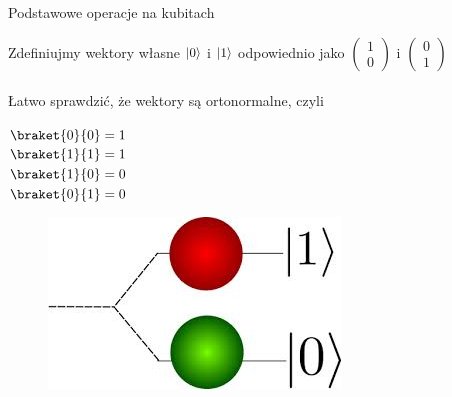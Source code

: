 \documentclass{beamer}
\DeclarePairedDelimiter\ket{\lvert}{\rangle}
\begin{document}
	\begin{frame}{Podstawowe operacje na kubitach}
		\begin{block}{   }
			\vspace{0.5em}
			Zdefiniujmy wektory własne $\ket{0}$ i $\ket{1}$ odpowiednio jako
			$\begin{pmatrix}
				1\\
				0
			\end{pmatrix}$
			i
			$\begin{pmatrix}
				0\\
				1
			\end{pmatrix}$
			\\~\\
			Łatwo sprawdzić, że wektory są ortonormalne, czyli
			\begin{multicols}{4}
				$\braket{0}{0} = 1$\\
				$\braket{1}{1} = 1$\\
				$\braket{1}{0} = 0$\\
				$\braket{0}{1} = 0$
			\end{multicols}
			\vspace{0.5em}
		\end{block}
	
		\begin{center}
			\begin{figure}
				\includegraphics[scale=0.53]{media/qubits.jpeg}
			\end{figure}
		\end{center}
	\end{frame}
\end{document}
